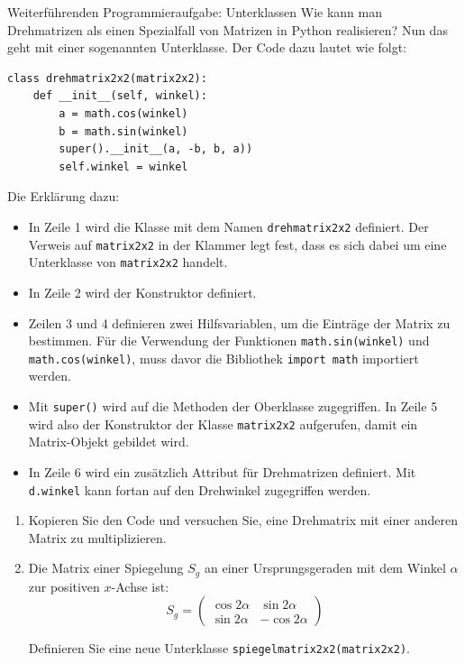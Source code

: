 \begin{ueb}
    {Weiterführenden Programmieraufgabe: Unterklassen}{}
    Wie kann man Drehmatrizen als einen Spezialfall von Matrizen in Python realisieren? Nun das geht mit einer sogenannten Unterklasse. Der Code dazu lautet wie folgt:
    \begin{lstlisting}
class drehmatrix2x2(matrix2x2):
    def __init__(self, winkel):
        a = math.cos(winkel)
        b = math.sin(winkel)
        super().__init__(a, -b, b, a))
        self.winkel = winkel \end{lstlisting}

 Die Erklärung dazu:
\begin{itemize}
    \item In Zeile 1 wird die Klasse mit dem Namen \lstinline|drehmatrix2x2| definiert. Der Verweis auf \lstinline|matrix2x2| in der Klammer legt fest, dass es sich dabei um eine Unterklasse von \lstinline|matrix2x2| handelt.
    \item In Zeile 2 wird der Konstruktor definiert.
    \item Zeilen 3 und 4 definieren zwei Hilfsvariablen, um die Einträge der Matrix zu bestimmen. Für die Verwendung der Funktionen \lstinline|math.sin(winkel)| und \lstinline|math.cos(winkel)|, muss davor die Bibliothek \lstinline|import math| importiert werden.
    \item Mit \lstinline|super()| wird auf die Methoden der Oberklasse zugegriffen. In Zeile 5 wird also der Konstruktor der Klasse \lstinline|matrix2x2| aufgerufen, damit ein Matrix-Objekt gebildet wird.
    \item In Zeile 6 wird ein zusätzlich Attribut für Drehmatrizen definiert. Mit \lstinline|d.winkel| kann fortan auf den Drehwinkel zugegriffen werden.
\end{itemize}

\begin{enumerate}
    \item Kopieren Sie den Code und versuchen Sie, eine Drehmatrix mit einer anderen Matrix zu multiplizieren.
    \item Die Matrix einer Spiegelung \( S_g \) an einer Ursprungsgeraden mit dem Winkel \( \alpha \) zur positiven $x$-Achse ist:
    \[
    S_g =
    \begin{pmatrix} 
    \cos 2\alpha & \sin 2\alpha \\ 
    \sin 2\alpha & -\cos 2\alpha 
    \end{pmatrix}
    \]

    Definieren Sie eine neue Unterklasse \lstinline|spiegelmatrix2x2(matrix2x2)|.
    
\end{enumerate} 


\end{ueb}






